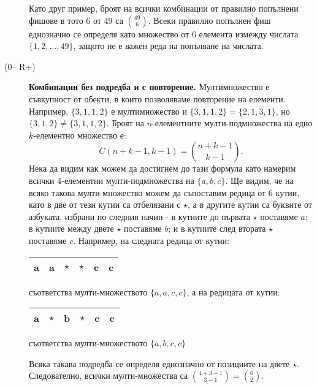 \begin{description}
  Като друг пример, броят на всички комбинации от правилно попълнени фишове в тото 6 от 49 са $\binom{49}{6}$.
  Всеки правилно попълнен фиш еднозначно се определя като множество от 6 елемента измежду числата $\{1,2,\dots,49\}$,
  защото не е важен реда на попълване на числата.
\item[(0-- R+)]
  {\bf Комбинации без подредба и с повторение.}
  Мултимножество е съвкупност от обекти, в които позволяваме повторение на елементи.
  Например, $\{3,1,1,2\}$ е мултимножество и $\{3,1,1,2\} = \{2,1,3,1\}$,
  но $\{3,1,2\} \neq \{3,1,1,2\}$.
  Броят на $n$-елементните мулти-подмножества на едно $k$-елементно множество е:
  \[C(n+k-1,k-1) = \binom{n+k-1}{k-1}.\]
  Нека да видим как можем да достигнем до тази формула като намерим всички 4-елементни мулти-подмножества
  на $\{a,b,c\}$. Ще видим, че на всяко такова мулти-множество можем да съпоставим редица от 6 кутии,
  като в две от тези кутии са отбелязани с $\star$, а в другите кутии са буквите от азбуката, избрани по следния начин - 
  в кутиите до първата $\star$ поставяме $a$; в кутиите между двете $\star$ поставяме $b$; и в кутиите след втората $\star$
  поставяме $c$.
  Например, на следната редица от кутии:
  
  \begin{tabular}{|l|l|l|l|l|l|}
    \hline
    a & a & $\star$ & $\star$ & c & c \\
    \hline
  \end{tabular}  
  съответства мулти-множеството $\{a,a,c,c\}$, а на редицата от кутии:

  \begin{tabular}{|l|l|l|l|l|l|}
    \hline
    a & $\star$ & b & $\star$ & c & c \\
    \hline
  \end{tabular}
  съответства мулти-множеството $\{a,b,c,c\}$
  
  Всяка такава подредба се определя еднозначно от позициите на двете $\star$.
  Следователно, всички мулти-множества са $\binom{4+3-1}{3-1} = \binom{6}{2}$.
\end{description}




